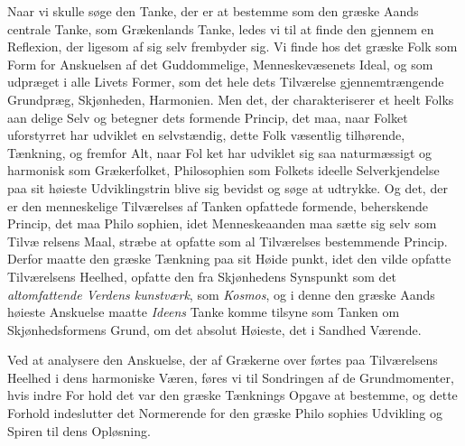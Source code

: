 \documentclass[12pt,a4paper]{book}
\begin{document}
Naar vi skulle søge den Tanke, der er at bestemme som
den græske Aands centrale Tanke, som Grækenlands Tanke,
ledes vi til at finde den gjennem en Reflexion, der ligesom af
sig selv frembyder sig. Vi finde hos det græske Folk som
Form for Anskuelsen af det Guddommelige, Menneskevæsenets
Ideal, og som udpræget i alle Livets Former, som det hele
dets Tilværelse gjennemtrængende Grundpræg, Skjønheden,
Harmonien. Men det, der charakteriserer et heelt Folks aan\-%
delige Selv og betegner dets formende Princip, det maa, naar
Folket uforstyrret har udviklet en selvstændig, dette Folk
væsentlig tilhørende, Tænkning, og fremfor Alt, naar Fol\-%
ket har udviklet sig saa naturmæssigt og harmonisk som
Grækerfolket, Philosophien som Folkets ideelle Selverkjendelse
paa sit høieste Udviklingstrin blive sig bevidst og søge at
udtrykke. Og det, der er den menneskelige Tilværelses af
Tanken opfattede formende, beherskende Princip, det maa Philo\-%
sophien, idet Menneskeaanden maa sætte sig selv som Tilvæ\-%
relsens Maal, stræbe at opfatte som al Tilværelses bestemmende
Princip. Derfor maatte den græske Tænkning paa sit Høide\-%
punkt, idet den vilde opfatte Tilværelsens Heelhed, opfatte den
fra Skjønhedens Synspunkt som det \emph{altomfattende Verdens\-%
kunstværk}, som \emph{Kosmos}, og i denne den græske Aands
høieste Anskuelse maatte \emph{Ideens} Tanke komme tilsyne som
Tanken om Skjønhedsformens Grund, om det absolut Høieste,
det i Sandhed Værende.

Ved at analysere den Anskuelse, der af Grækerne over\-%
førtes paa Tilværelsens Heelhed i dens harmoniske Væren,
føres vi til Sondringen af de Grundmomenter, hvis indre For\-%
hold det var den græske Tænknings Opgave at bestemme, og
dette Forhold indeslutter det Normerende for den græske Philo\-%
sophies Udvikling og Spiren til dens Opløsning.
\end{document}
